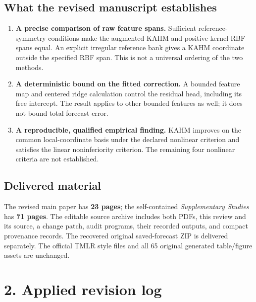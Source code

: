 \documentclass[11pt]{article}
\begin{document}
\subsection*{What the revised manuscript establishes}
\begin{enumerate}
\item \textbf{A precise comparison of raw feature spans.} Sufficient
reference-symmetry conditions make the augmented KAHM and positive-kernel
RBF spans equal. An explicit irregular reference bank gives a KAHM
coordinate outside the specified RBF span. This is not a universal
ordering of the two methods.
\item \textbf{A deterministic bound on the fitted correction.} A bounded
feature map and centered ridge calculation control the residual head,
including its free intercept. The result applies to other bounded
features as well; it does not bound total forecast error.
\item \textbf{A reproducible, qualified empirical finding.} KAHM improves
on the common local-coordinate basis under the declared nonlinear
criterion and satisfies the linear noninferiority criterion. The
remaining four nonlinear criteria are not established.
\end{enumerate}

\subsection*{Delivered material}
The revised main paper has \textbf{23 pages}; the self-contained
\emph{Supplementary Studies} has \textbf{71 pages}. The editable source
archive includes both PDFs, this review and its source, a change patch,
audit programs, their recorded outputs, and compact provenance records.
The recovered original saved-forecast ZIP is delivered separately. The
official TMLR style files and all 65 original generated table/figure
assets are unchanged.

\newpage
\section*{2. Applied revision log}
\end{document}
